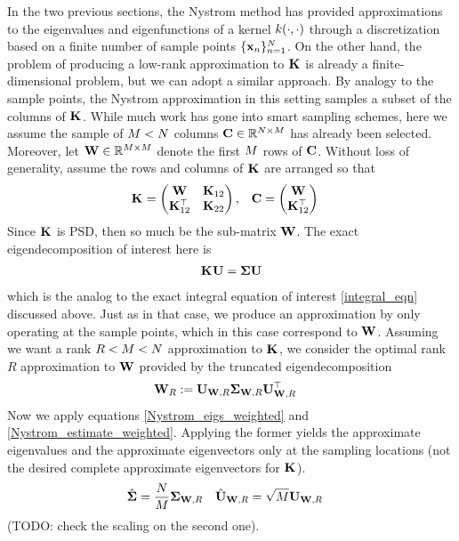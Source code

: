 \documentclass[12pt]{article}
\begin{document}
In the two previous sections, the Nystrom method has provided approximations to the eigenvalues and eigenfunctions of a kernel $\GPKer(\cdot, \cdot)$ through a discretization 
based on a finite number of sample points $\{\bx_{\designIdx}\}_{\designIdx = 1}^{\Ndesign}$. On the other hand, the problem of producing a low-rank approximation to $\kerMat$ is already 
a finite-dimensional problem, but we can adopt a similar approach. By analogy to the sample points, the Nystrom approximation in this setting samples a subset of the columns of $\kerMat$. 
While much work has gone into smart sampling schemes, here we assume the sample of $\NpseudoData < \Ndesign$ columns $\bC \in \R^{\Ndesign \times \NpseudoData}$ has already been 
selected. Moreover, let $\bW \in \R^{\NpseudoData \times \NpseudoData}$ denote the first $\NpseudoData$ rows of $\bC$. Without loss of generality, assume the 
rows and columns of $\kerMat$ are arranged so that 
\begin{align}
\kerMat &= \begin{pmatrix} \bW & \kerMat[12] \\ \kerMat[12]^\top & \kerMat[22] \end{pmatrix}, &&\bC = \begin{pmatrix} \bW \\ \kerMat[12]^\top \end{pmatrix}
\end{align}
Since $\kerMat$ is PSD, then so much be the sub-matrix $\bW$. The exact eigendecomposition of interest here is 
\begin{align}
\kerMat \bU = \Sig \bU
\end{align}
which is the analog to the exact integral equation of interest \ref{integral_eqn} discussed above. Just as in that case, we produce an approximation by only operating at the 
sample points, which in this case correspond to $\bW$. Assuming we want a rank $R < \NpseudoData < \Ndesign$ approximation to $\kerMat$, we consider the optimal rank $R$
approximation to $\bW$ provided by the truncated eigendecomposition 
\begin{align}
\bW_R &:= \bU_{\bW, R} \Sig_{\bW, R} \bU_{\bW, R}^\top 
\end{align}
Now we apply equations \ref{Nystrom_eigs_weighted} and \ref{Nystrom_estimate_weighted}. Applying the former yields the approximate eigenvalues and the approximate eigenvectors 
only at the sampling locations (not the desired complete approximate eigenvectors for $\kerMat$). 
\begin{align}
&\hat{\Sig} = \frac{\Ndesign}{\NpseudoData} \Sig_{\bW, R}  &&\hat{\bU}_{\bW, R} = \sqrt{\NpseudoData} \bU_{\bW, R} \label{Nystrom_eigs_weighted}
\end{align}
(TODO: check the scaling on the second one). 
\end{document}

